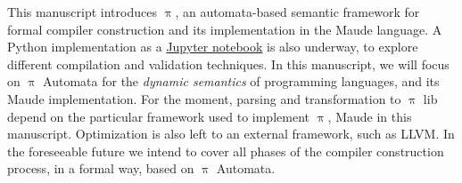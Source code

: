 \documentclass[a4paper,openany]{book}
\begin{document}

This manuscript introduces $\uppi$, an automata-based semantic framework for formal compiler construction and its implementation in the Maude language. A Python implementation as a \href{https://nbviewer.jupyter.org/github/ChristianoBraga/BPLC/blob/master/python/pi.ipynb}{Jupyter notebook} is also underway, to explore different compilation and validation techniques.
In this manuscript, we will focus on $\uppi$ Automata for the \emph{dynamic semantics} of programming languages, and its Maude implementation. %
For the moment, parsing and transformation to $\uppi$ lib depend on the particular framework used to implement $\uppi$, Maude in this manuscript. Optimization is also left to an external framework, such as LLVM. In the foreseeable future we intend to cover all phases of the compiler construction process, in a formal way, based on $\uppi$ Automata.
\end{document}
